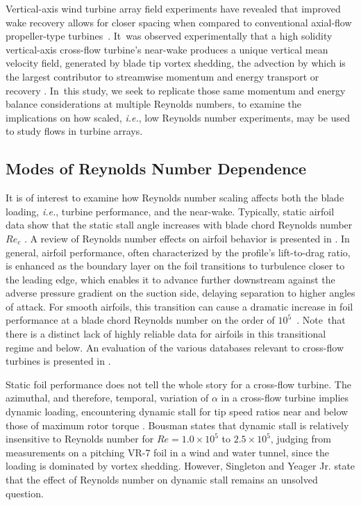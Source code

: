 Vertical-axis wind turbine array field experiments have revealed that improved
wake recovery allows for closer spacing when compared to conventional axial-flow
propeller-type \mbox{turbines \cite{Dabiri2011, Kinzel2012}}. It~was observed
experimentally that a high solidity vertical-axis cross-flow turbine's near-wake
produces a unique vertical mean velocity field, generated by blade tip vortex
shedding, the advection by which is the largest contributor to streamwise
momentum and energy transport or recovery \cite{Bachant2015-JoT}. In~this study,
we seek to replicate those same momentum and energy balance considerations at
multiple Reynolds numbers, to examine the implications on how scaled,
\emph{i.e.}, low Reynolds number experiments, may be used to study flows in
turbine arrays.


\subsection{Modes of Reynolds Number Dependence}

It is of interest to examine how Reynolds number scaling affects both the blade
loading, \emph{i.e.}, turbine performance, and the near-wake. Typically, static
airfoil data show that the static stall angle increases with blade chord
Reynolds number $Re_c$ \cite{Jacobs1937}. A review of Reynolds number effects on
airfoil behavior is presented in \cite{Lissaman1983}. In general, airfoil
performance, often characterized by the profile's lift-to-drag ratio, is
enhanced as the boundary layer on the foil transitions to turbulence closer to
the leading edge, which enables it to advance further downstream against the
adverse pressure gradient on the suction side, delaying separation to higher
angles of attack. For smooth airfoils, this transition can cause a dramatic
increase in foil performance at a blade chord Reynolds number on the order of
\mbox{$10^5$ \cite{McMasters1980}}. Note~that there is a distinct lack of highly
reliable data for airfoils in this transitional regime and below. An evaluation
of the various databases relevant to cross-flow turbines is presented in
\cite{Bedon2014}.

Static foil performance does not tell the whole story for a cross-flow turbine.
The azimuthal, and therefore, temporal, variation of $\alpha$ in a cross-flow
turbine implies dynamic loading, encountering dynamic stall for tip speed ratios
near and below those of maximum rotor torque \cite{Para2002}. Bousman
\cite{Bousman2000-evaluation} states that dynamic stall is relatively
insensitive to Reynolds number for $Re=1.0 \times 10^5$ to $2.5 \times 10^5$,
judging from measurements on a pitching VR-7 foil in a wind and water tunnel,
since the loading is dominated by vortex shedding. However, Singleton and Yeager
Jr. \cite{Singleton2000} state that the effect of Reynolds number on dynamic
stall remains an unsolved question.

